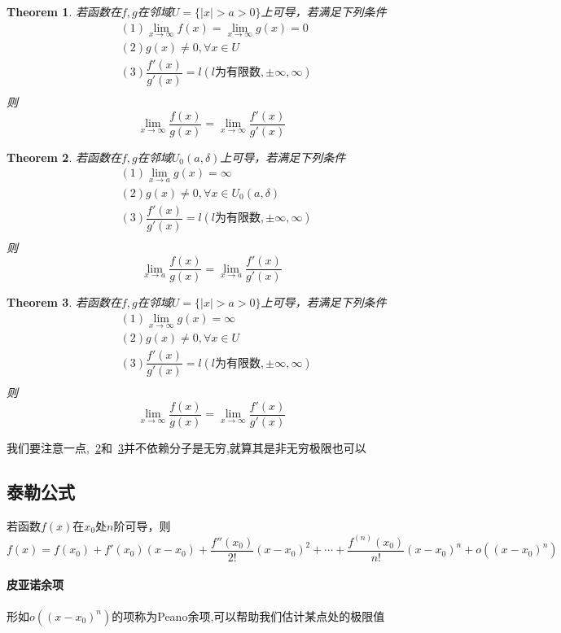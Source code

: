 \documentclass[11pt,hyperref,a4paper,UTF8]{ctexart}
\newtheorem{theorem}{Theorem}[subsection]
\begin{document}
\begin{CJK}{UTF8}{gkai}
\begin{theorem}
若函数在$f,g$在邻域$U = \{|x| > a > 0\}$上可导，若满足下列条件
\[
\begin{aligned}
&(1)\lim_{x\to \infty}f(x) =\lim_{x\to \infty } g(x) = 0\\
&(2)g(x) \neq 0 ,\forall x\in U\\
&(3)\dfrac{f'(x)}{g'(x)} = l(l\text{为有限数},\pm\infty,\infty)\\
\end{aligned}
\]
则
\[\lim_{x\to \infty}\dfrac{f(x)}{g(x)}=\lim_{x\to \infty}\dfrac{f'(x)}{g'(x)}\]
\end{theorem}

\begin{theorem}\label{lh3}
若函数在$f,g$在邻域$U_0(a,\delta)$上可导，若满足下列条件
\[
\begin{aligned}
&(1)\lim_{x\to a } g(x) = \infty\\
&(2)g(x) \neq 0 ,\forall x\in U_0(a,\delta)\\
&(3)\dfrac{f'(x)}{g'(x)} = l(l\text{为有限数},\pm\infty,\infty)\\
\end{aligned}
\]
则
\[\lim_{x\to a}\dfrac{f(x)}{g(x)}=\lim_{x\to a}\dfrac{f'(x)}{g'(x)}\]
\end{theorem}

\begin{theorem}\label{lh4}
若函数在$f,g$在邻域$U = \{|x| > a > 0\}$上可导，若满足下列条件
\[
\begin{aligned}
&(1)\lim_{x\to \infty } g(x) = \infty\\
&(2)g(x) \neq 0 ,\forall x\in U\\
&(3)\dfrac{f'(x)}{g'(x)} = l(l\text{为有限数},\pm\infty,\infty)\\
\end{aligned}
\]
则
\[\lim_{x\to \infty}\dfrac{f(x)}{g(x)}=\lim_{x\to \infty}\dfrac{f'(x)}{g'(x)}\]
\end{theorem}
我们要注意一点,~\ref{lh3}和~\ref{lh4}并不依赖分子是无穷,就算其是非无穷极限也可以\\
\subsection{泰勒公式}
若函数$f(x)$在$x_0$处$n$阶可导，则
\[f(x) = f(x_0) + f'(x_0) (x-x_0) + \dfrac{f''(x_0)}{2 !} (x-x_0)^2 + \cdots + \dfrac{f^{(n)}(x_0)}{n !} (x-x_0)^n +o ((x-x_0)^n)\]
\paragraph{皮亚诺余项\\}
形如$o ((x-x_0)^n)$的项称为Peano余项,可以帮助我们估计某点处的极限值


\end{CJK}
\end{document}
